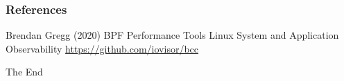 \documentclass{beamer}
\begin{document}
\begin{frame}
\frametitle{References}
\footnotesize{
\begin{thebibliography}{99} %
 Brendan Gregg (2020)
\newblock BPF Performance Tools
\newblock Linux System and Application Observability
 \url{https://github.com/iovisor/bcc}
\end{thebibliography}
}
\end{frame}


\begin{frame}
\Huge{\centerline{The End}}
\end{frame}

\end{document}

